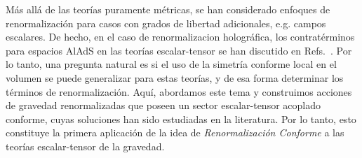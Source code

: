 \documentclass[../Main.tex]{subfiles}
\begin{document}
Más allá de las teorías puramente métricas, se han considerado enfoques de renormalización para casos con grados de libertad adicionales, e.g. campos escalares. De hecho, en el caso de renormalizacion holográfica, los contratérminos para espacios AlAdS en las teorías escalar-tensor se han discutido en Refs.~\cite{Nojiri:1998dh,Padilla:2012ze,Caldarelli:2016nni,Liu:2017kml,Li:2018rgn,Agurto-Sepulveda:2022vvf}. Por lo tanto, una pregunta natural es si el uso de la simetría conforme local en el volumen se puede generalizar para estas teorías, y de esa forma determinar los términos de renormalización. Aquí, abordamos este tema y construimos acciones de gravedad renormalizadas que poseen un sector escalar-tensor acoplado conforme, cuyas soluciones han sido estudiadas en la literatura. Por lo tanto, esto constituye la primera aplicación de la idea de \emph{Renormalización Conforme} a las teorías escalar-tensor de la gravedad.


\biblio %
\end{document}
